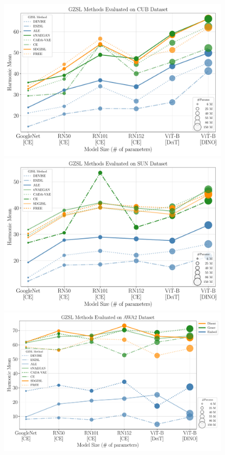 \begin{figure}[tp]
\begin{minipage}[t]{0.32\textwidth}
  \includegraphics[align=t,width=\linewidth]{Images/cub_noclip_noft.pdf}
\end{minipage}%
\hfill %
\begin{minipage}[t]{0.32\textwidth}
  \includegraphics[align=t,width=\linewidth]{Images/sun_noclip_noft.pdf}
\end{minipage}%
\hfill
\begin{minipage}[t]{0.35\textwidth}
  \includegraphics[align=t,width=\linewidth]{Images/awa2_noclip_noft.pdf}

\end{minipage}
\end{figure}
